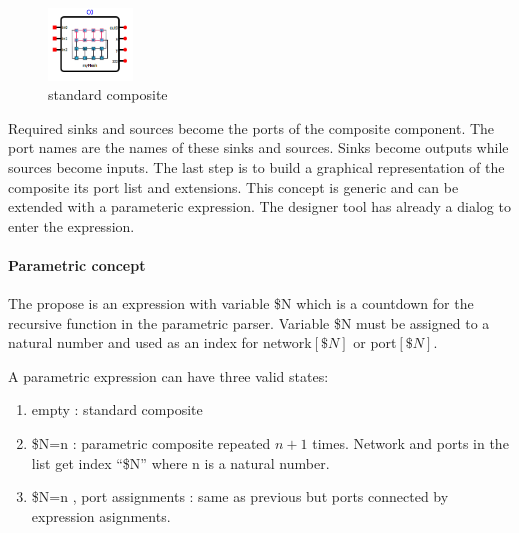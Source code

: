\begin{figure}
  \vspace{-20pt}
  \begin{center}
    \includegraphics[width=0.20\textwidth]{pictures/composite-boxed}
  \end{center}
  \vspace{-20pt}
  \label{fig:composite-boxed}
  \caption{standard composite}
  \vspace{-10pt}
\end{figure}

Required sinks and sources become the ports of the composite component. The port
names are the names of these sinks and sources. Sinks become outputs while
sources become inputs. The last step is to build a graphical representation of the
composite its port list and extensions. This concept is generic and can be
extended with a parameteric expression.
The designer tool has already a dialog to enter the expression.

\paragraph{Parametric concept}
The propose is an expression with variable \$N which is a countdown for the
recursive function in the parametric parser. Variable \$N must be assigned to a
natural number and used as an index for network$[\$N]$ or port$[\$N]$.

A parametric expression can have three valid states:

\begin{enumerate}
\item empty : standard composite
\item \$N=n : parametric composite repeated $n+1$ times. Network and ports in
the list get index ``\$N'' where n is a natural number.
\item \$N=n , port assignments : same as previous but ports connected by
expression asignments.
\end{enumerate}

